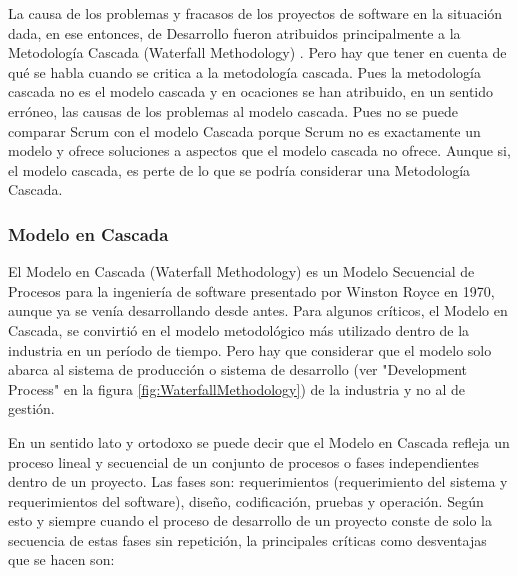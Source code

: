 La causa de los problemas y fracasos de los proyectos de software en la situación dada, en ese entonces, de Desarrollo fueron atribuidos principalmente a la Metodología Cascada (Waterfall Methodology) \cite{Ken-Schwaber-1995}. Pero hay que tener en cuenta de qué se habla cuando se critica a la metodología cascada. Pues la metodología cascada no es el modelo cascada y en ocaciones se han atribuido, en un sentido erróneo, las causas de los problemas al modelo cascada. Pues no se puede comparar Scrum con el modelo Cascada porque Scrum no es exactamente un modelo y ofrece soluciones a aspectos que el modelo cascada no ofrece. Aunque si, el modelo cascada, es perte de lo que se podría considerar una Metodología Cascada. 

\subsubsection{Modelo en Cascada}

El Modelo en Cascada (Waterfall Methodology) \cite{Ken-Schwaber-1995} es un Modelo Secuencial de Procesos para la ingeniería de software presentado por Winston Royce en 1970, aunque ya se venía desarrollando desde antes. Para algunos críticos, el Modelo en Cascada, se convirtió en el modelo metodológico más utilizado dentro de la industria en un período de tiempo. Pero hay que considerar que el modelo solo abarca al sistema de producción o sistema de desarrollo (ver "Development Process" en la figura \ref{fig:WaterfallMethodology}) de la industria y no al de gestión.

En un sentido lato y ortodoxo se puede decir que el Modelo en Cascada refleja un proceso lineal y secuencial de un conjunto de procesos o fases independientes dentro de un proyecto. Las fases son: requerimientos (requerimiento del sistema y requerimientos del software), diseño, codificación, pruebas y operación. Según esto y siempre cuando el proceso de desarrollo de un proyecto conste de solo la secuencia de estas fases sin repetición, la principales críticas como desventajas que se hacen son:

